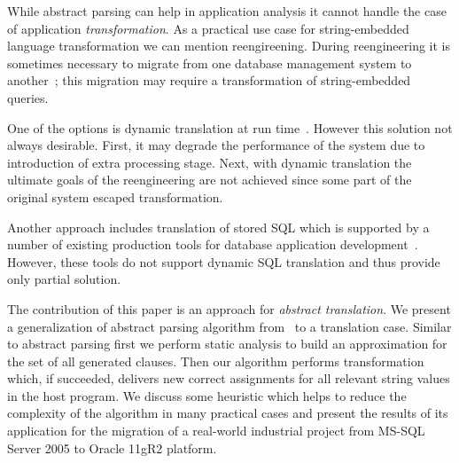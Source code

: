 While abstract parsing can help in application analysis it cannot handle the case of application
\emph{transformation}. As a practical use case for string-embedded language transformation we can mention
reengireening. During reengineering it is sometimes necessary to migrate from one database management 
system to another~\cite{NetDbTransform}; this migration may require a transformation of string-embedded 
queries. 

One of the options is dynamic translation at run time~\cite{OpenSystemsDBMS}. However this solution
not always desirable. First, it may degrade the performance of the system due to introduction of extra 
processing stage. Next, with dynamic translation the ultimate goals of the reengineering are not achieved 
since some part of the original system escaped transformation. 

Another approach includes translation of stored SQL which is supported by a number of existing production tools 
for database application development~\cite{PLSQL,SwissSQL,SQLWays}. However, these tools do not support 
dynamic SQL translation and thus provide only partial solution. 

The contribution of this paper is an approach for \emph{abstract translation}. We present a generalization
of abstract parsing algorithm from~\cite{AbstrParsing} to a translation case. Similar to abstract parsing 
first we perform static analysis to build an approximation for the set of all generated clauses. Then our 
algorithm performs transformation which, if succeeded, delivers new correct assignments for all relevant 
string values in the host program. We discuss some heuristic which helps to reduce the complexity
of the algorithm in many practical cases and present the results of its application for the migration
of a real-world industrial project from MS-SQL Server 2005 to Oracle 11gR2 platform.




